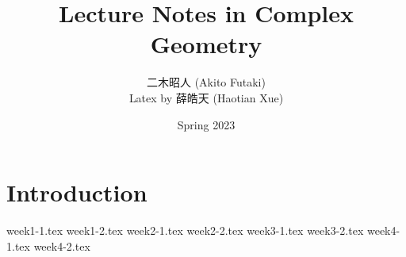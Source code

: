 \documentclass[twoside,12pt]{book}
\title{\Huge Lecture Notes in Complex Geometry}
\author{{\Large 二木昭人} (Akito Futaki)\\
Latex by 薛皓天 (Haotian Xue)}
\date{\Large Spring 2023}
\begin{document}
\maketitle
\frontmatter
\tableofcontents
\newpage
\mainmatter{}

\chapter{Introduction}
{week1-1.tex}
{week1-2.tex}
{week2-1.tex}
{week2-2.tex}
{week3-1.tex}
{week3-2.tex}
{week4-1.tex}
{week4-2.tex}
\end{document}

